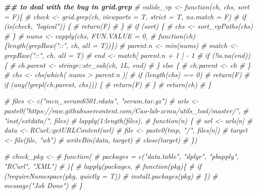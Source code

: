 \documentclass[
]{article}
\newenvironment{Shaded}{\begin{snugshade}}{\end{snugshade}}
\newcommand{\CommentTok}[1]{\textcolor[rgb]{0.56,0.35,0.01}{\textit{#1}}}
\newcommand{\DocumentationTok}[1]{\textcolor[rgb]{0.56,0.35,0.01}{\textbf{\textit{#1}}}}
\begin{document}
\begin{Shaded}
\begin{Highlighting}[]
\DocumentationTok{\#\# to deal with the bug in \textasciigrave{}grid.grep\textasciigrave{}}
\CommentTok{\# valide\_vp \textless{}{-} function(ch, chs, sort = F)\{}
  \CommentTok{\# check \textless{}{-} grid.grep(ch, viewports = T, strict = T, no.match = F)}
  \CommentTok{\# if (is(check, "logical")) \{}
  \CommentTok{\#   return(F)}
  \CommentTok{\# \}}
  \CommentTok{\# if (sort) \{}
  \CommentTok{\#   chs \textless{}{-} sort\_vpPaths(chs)}
  \CommentTok{\# \}}
  \CommentTok{\# nums \textless{}{-} vapply(chs, FUN.VALUE = 0,}
  \CommentTok{\#                function(ch) \{length(grepRaw("::", ch, all = T))\})}
  \CommentTok{\# parent.n \textless{}{-} min(nums)}
  \CommentTok{\# match \textless{}{-} grepRaw("::", ch, all = T)}
  \CommentTok{\# end \textless{}{-} match[ parent.n + 1 ] {-} 1}
  \CommentTok{\# if (!is.na(end)) \{}
  \CommentTok{\#   ch.parent \textless{}{-} stringr::str\_sub(ch, 1L, end)}
  \CommentTok{\# \} else \{}
  \CommentTok{\#   ch.parent \textless{}{-} ch}
  \CommentTok{\# \}}
  \CommentTok{\# chs \textless{}{-} chs[which( nums \textgreater{} parent.n )]}
  \CommentTok{\# if (length(chs) == 0)}
  \CommentTok{\#   return(F)}
  \CommentTok{\# if (any(!grepl(ch.parent, chs))) \{}
  \CommentTok{\#   return(F)}
  \CommentTok{\# \}}
  \CommentTok{\# return(ch)}
\CommentTok{\# \}}

\CommentTok{\# files \textless{}{-} c("mcn\_serum6501.rdata", "serum.tar.gz")}
\CommentTok{\#   urls \textless{}{-} paste0("https://raw.githubusercontent.com/Cao{-}lab{-}zcmu/utils\_tool/master/",}
\CommentTok{\#                 "inst/extdata/", files)}
\CommentTok{\#   lapply(1:length(files),}
\CommentTok{\#          function(n) \{}
\CommentTok{\#            url \textless{}{-} urls[n]}
\CommentTok{\#            data \textless{}{-} RCurl::getURLContent(url)}
\CommentTok{\#            file \textless{}{-} paste0(tmp, "/", files[n])}
\CommentTok{\#            target \textless{}{-} file(file, "wb")}
\CommentTok{\#            writeBin(data, target)}
\CommentTok{\#            close(target)}
\CommentTok{\#          \})}

\CommentTok{\# check\_pkg \textless{}{-}}
\CommentTok{\#   function(}
\CommentTok{\#            packages = c("data.table", "dplyr", "pbapply", "RCurl", "XML")}
\CommentTok{\#            )\{}
\CommentTok{\#     lapply(packages,}
\CommentTok{\#          function(pkg)\{}
\CommentTok{\#            if (!requireNamespace(pkg, quietly = T))}
\CommentTok{\#              install.packages(pkg)}
\CommentTok{\#          \})}
\CommentTok{\#     message("Job Done")}
\CommentTok{\# \}}


\end{Highlighting}
\end{Shaded}
\end{document}
